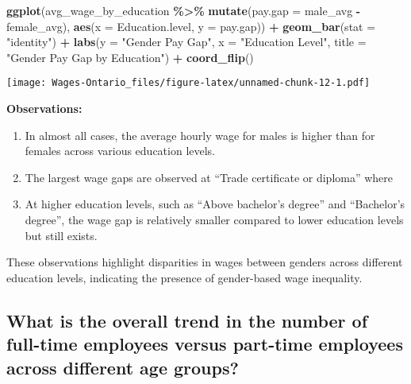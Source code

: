 \documentclass[
]{article}
\newenvironment{Shaded}{\begin{snugshade}}{\end{snugshade}}
\newcommand{\AttributeTok}[1]{\textcolor[rgb]{0.13,0.29,0.53}{#1}}
\newcommand{\FunctionTok}[1]{\textcolor[rgb]{0.13,0.29,0.53}{\textbf{#1}}}
\newcommand{\NormalTok}[1]{#1}
\newcommand{\SpecialCharTok}[1]{\textcolor[rgb]{0.81,0.36,0.00}{\textbf{#1}}}
\newcommand{\StringTok}[1]{\textcolor[rgb]{0.31,0.60,0.02}{#1}}
\providecommand{\tightlist}{%
  \setlength{\itemsep}{0pt}\setlength{\parskip}{0pt}}
\begin{document}
\begin{Shaded}
\begin{Highlighting}[]
\FunctionTok{ggplot}\NormalTok{(avg\_wage\_by\_education }\SpecialCharTok{\%\textgreater{}\%} \FunctionTok{mutate}\NormalTok{(}\AttributeTok{pay.gap =}\NormalTok{ male\_avg }\SpecialCharTok{{-}}\NormalTok{ female\_avg), }
       \FunctionTok{aes}\NormalTok{(}\AttributeTok{x =}\NormalTok{ Education.level, }\AttributeTok{y =}\NormalTok{ pay.gap)) }\SpecialCharTok{+}
  \FunctionTok{geom\_bar}\NormalTok{(}\AttributeTok{stat =} \StringTok{"identity"}\NormalTok{) }\SpecialCharTok{+}
  \FunctionTok{labs}\NormalTok{(}\AttributeTok{y =} \StringTok{"Gender Pay Gap"}\NormalTok{,}
       \AttributeTok{x =} \StringTok{"Education Level"}\NormalTok{,}
       \AttributeTok{title =} \StringTok{"Gender Pay Gap by Education"}\NormalTok{) }\SpecialCharTok{+}
  \FunctionTok{coord\_flip}\NormalTok{()}
\end{Highlighting}
\end{Shaded}

\texttt{[image: Wages-Ontario\_files/figure-latex/unnamed-chunk-12-1.pdf]}

\textbf{Observations:}

\begin{enumerate}
\def\labelenumi{\arabic{enumi}.}
\tightlist
\item
  In almost all cases, the average hourly wage for males is higher than
  for females across various education levels.
\item
  The largest wage gaps are observed at ``Trade certificate or diploma''
  where
\item
  At higher education levels, such as ``Above bachelor's degree'' and
  ``Bachelor's degree'', the wage gap is relatively smaller compared to
  lower education levels but still exists.
\end{enumerate}

These observations highlight disparities in wages between genders across
different education levels, indicating the presence of gender-based wage
inequality.

\subsection{What is the overall trend in the number of full-time
employees versus part-time employees across different age
groups?}\label{what-is-the-overall-trend-in-the-number-of-full-time-employees-versus-part-time-employees-across-different-age-groups}
\end{document}
